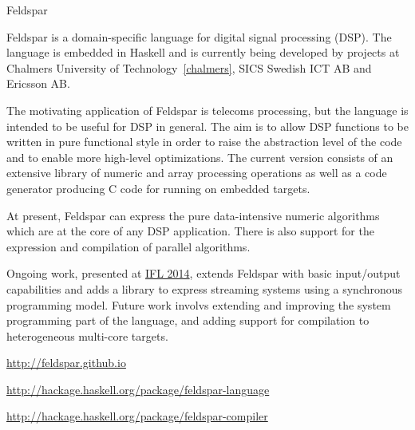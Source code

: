 \begin{hcarentry}{Feldspar}
\label{feldspar}
\makeheader

Feldspar is a domain-specific language for digital signal processing (DSP). The
language is embedded in Haskell and is currently being developed by projects at
Chalmers University of Technology~\cref{chalmers}, SICS Swedish ICT AB and
Ericsson AB.

The motivating application of Feldspar is telecoms processing, but the language
is intended to be useful for DSP in general. The aim is to allow DSP functions
to be written in pure functional style in order to raise the abstraction level of
the code and to enable more high-level optimizations. The current version consists
of an extensive library of numeric and array processing operations as well as a
code generator producing C code for running on embedded targets.

At present, Feldspar can express the pure data-intensive numeric algorithms
which are at the core of any DSP application. There is also support for the
expression and compilation of parallel algorithms.

Ongoing work, presented at \href{http://ifl2014.github.io/submissions/ifl2014_submission_23.pdf}{IFL 2014},
extends Feldspar with basic input/output capabilities and adds a library to
express streaming systems using a synchronous programming model. Future work
involvs extending and improving the system programming part of the language, and
adding support for compilation to heterogeneous multi-core targets.

\FurtherReading
\begin{compactitem}
\item \url{http://feldspar.github.io}
\item \url{http://hackage.haskell.org/package/feldspar-language}
\item \url{http://hackage.haskell.org/package/feldspar-compiler}
\end{compactitem}
\end{hcarentry}
